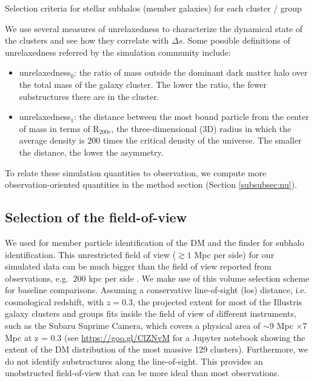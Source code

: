 \begin{table*}
\begin{center}
	\caption{ Selection criteria for stellar subhalos (member galaxies) for each
		cluster / group 
\label{tab:member_galaxy_selections}} 
  
\end{center} 
\end{table*}
We use several measures of unrelaxedness to characterize 
the dynamical state of the clusters and see how they correlate with $\Delta s$.
Some possible definitions of unrelaxedness referred by the simulation community
include:
\begin{itemize}
	\item unrelaxedness$_0$: the ratio of mass outside the dominant dark matter halo over the total mass
		of the galaxy cluster. The lower the ratio, the fewer substructures there
		are in the cluster. 
	\item unrelaxedness$_1$: the distance between the most bound particle from
		the center of mass in terms of R$_{200c}$, the three-dimensional (3D) radius in which the
		average density is 200 times the critical density of the universe. 
		The smaller the distance, the lower the asymmetry. 
\end{itemize}
To relate these simulation quantities to observation, 
we compute more observation-oriented 
quantities in the method section (Section \ref{subsubsec:nu}). 

\subsection{Selection of the field-of-view}
\label{sec:FOV}


We used {} for member particle identification of the DM and the 
{} finder for subhalo identification.
This unrestricted field of view ($\gtrsim 1$ Mpc per side) for our simulated data can be much bigger than
the field of view reported from
observations, e.g. $~200$ kpc per side \citep{Zitrin2012a}. We make use of this volume selection scheme
for baseline comparisons. Assuming a conservative line-of-sight (los) distance, 
i.e. cosmological redshift, with  $z = 0.3$, 
the projected extent for most of the Illustris galaxy clusters and groups
fits inside the field of view of different instruments, such as the Subaru Suprime Camera,
which covers a physical area of $\sim 9$ Mpc $\times 7$ Mpc at z = 0.3 
(see \href{https://goo.gl/ClZNvM}{https://goo.gl/ClZNvM} for a Jupyter notebook 
showing the extent of the DM distribution of the most massive 129
clusters). Furthermore, we do not identify substructures along the line-of-sight.
This provides an unobstructed field-of-view that can be more ideal than most observations.

